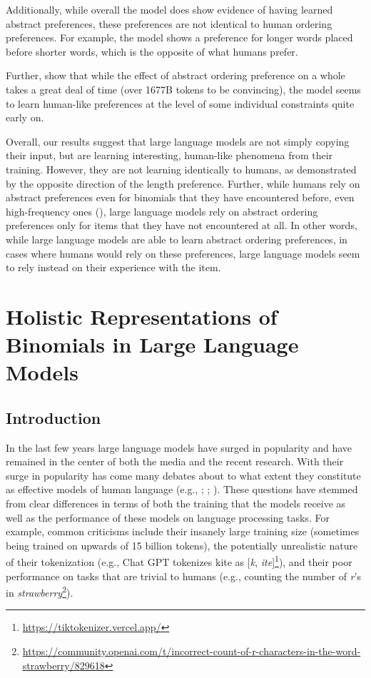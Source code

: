 \documentclass[
  12pt,
  letterpaper,
]{scrreprt}
\begin{document}
Additionally, while overall the model does show evidence of having
learned abstract preferences, these preferences are not identical to
human ordering preferences. For example, the model shows a preference
for longer words placed before shorter words, which is the opposite of
what humans prefer.

Further, show that while the effect of abstract ordering preference on a
whole takes a great deal of time (over 1677B tokens to be convincing),
the model seems to learn human-like preferences at the level of some
individual constraints quite early on.

Overall, our results suggest that large language models are not simply
copying their input, but are learning interesting, human-like phenomena
from their training. However, they are not learning identically to
humans, as demonstrated by the opposite direction of the length
preference. Further, while humans rely on abstract preferences even for
binomials that they have encountered before, even high-frequency ones
(), large language models
rely on abstract ordering preferences only for items that they have not
encountered at all. In other words, while large language models are able
to learn abstract ordering preferences, in cases where humans would rely
on these preferences, large language models seem to rely instead on
their experience with the item.


\chapter{Holistic Representations of Binomials in Large Language
Models}\label{holistic-representations-of-binomials-in-large-language-models}

\section{Introduction}\label{introduction-4}

In the last few years large language models have surged in popularity
and have remained in the center of both the media and the recent
research. With their surge in popularity has come many debates about to
what extent they constitute as effective models of human language (e.g.,
;
;
). These questions have stemmed from clear differences in terms of
both the training that the models receive as well as the performance of
these models on language processing tasks. For example, common
criticisms include their insanely large training size (sometimes being
trained on upwards of 15 billion tokens), the potentially unrealistic
nature of their tokenization (e.g., Chat GPT tokenizes kite as
{[}\emph{k}, \emph{ite}{]}\footnote{\url{https://tiktokenizer.vercel.app/}}),
and their poor performance on tasks that are trivial to humans (e.g.,
counting the number of \emph{r}'s in \emph{strawberry}\footnote{\url{https://community.openai.com/t/incorrect-count-of-r-characters-in-the-word-strawberry/829618}}).
\end{document}

